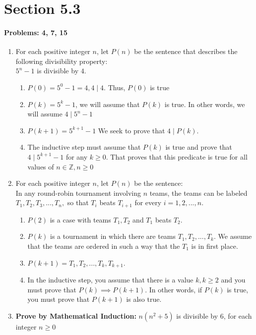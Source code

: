 \documentclass{article}
\makeatletter
\newcommand\setItemnumber[1]{\setcounter{enum\romannumeral\@enumdepth}{\numexpr#1-1\relax}}
\makeatother
\begin{document}
\section{Section 5.3}
\paragraph{Problems: 4, 7, 15}
\begin{enumerate}
    \setItemnumber{4}
    \item For each positive integer $n$, let $P(n)$ be the sentence that describes the following divisibility property:\\ $5^n-1$ is divisible by $4$.
    \begin{enumerate}
        \item $P(0) = 5^0-1 = 4, 4\mid4$. Thus, $P(0)$ is true
        \item $P(k) = 5^k-1$, we will assume that $P(k)$ is true. In other words, we will assume $4\mid5^n-1$
        \item $P(k+1) = 5^{k+1}-1$ We seek to prove that $4\mid P(k).$
        \item The inductive step must assume that $P(k)$ is true and prove that $4\mid5^{k+1}-1$ for any $k\geq0$. That proves that this predicate is true for all values of $n\in\mathbb{Z},n\geq0$ 
     \end{enumerate}
    \setItemnumber{7}
    \item For each positive integer $n$, let $P(n)$ be the sentence:\\
    In any round-robin tournament involving $n$ teams, the teams can be labeled $T_1, T_2, T_3,...,T_n,$ so that $T_i$ beats $T_{i+1}$ for every $i=1,2,...,n.$
    \begin{enumerate}
        \item $P(2)$ is a case with teams $T_1,T_2$ and $T_1$ beats $T_2$.
        \item $P(k)$ is a tournament in which there are teams $T_1,T_2,...,T_k$. We assume that the teams are ordered in such a way that the $T_1$ is in first place.
        \item $P(k+1) = T_1,T_2,...,T_k,T_{k+1}$.
        \item In the inductive step, you assume that there is a value $k, k\geq2$ and you must prove that $P(k)\implies P(k+1)$. In other words, if $P(k)$ is true, you must prove that $P(k+1)$ is also true. 
    \end{enumerate}
    \setItemnumber{15}
    \item \textbf{Prove by Mathematical Induction: }$n(n^2+5)$ is divisible by 6, for each integer $n\geq0$\\

\end{enumerate}
\end{document}
